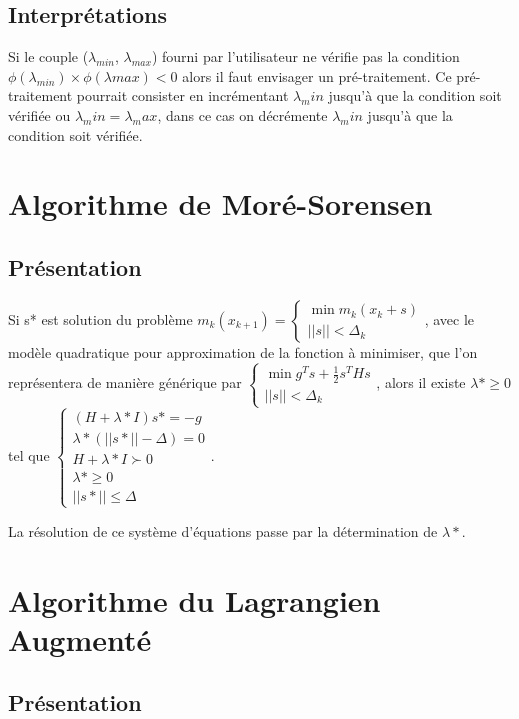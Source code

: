 \documentclass[a4paper,12pt]{article}
\theoremstyle{break}
\begin{document}
\subsection{Interprétations}
Si le couple ($\lambda_{min}$, $\lambda_{max}$) fourni par l'utilisateur ne vérifie pas la condition $\phi(\lambda_{min}) \times \phi(\lambda{max}) < 0$ alors il faut envisager un pré-traitement. Ce pré-traitement pourrait consister en incrémentant $\lambda_min$ jusqu'à que la condition soit vérifiée ou $\lambda_min = \lambda_max$, dans ce cas on décrémente $\lambda_min$ jusqu'à que la condition soit vérifiée.

\newpage

\section{Algorithme de Moré-Sorensen}
\subsection{Présentation}

Si s* est solution du problème 
$m_k(x_{k+1}) = \begin{cases}
			\min m_k(x_k+s) \\
			||s||< \Delta_k
		\end{cases}$, avec le modèle quadratique pour approximation de la fonction à minimiser, que l’on représentera de manière générique par $\begin{cases}
			\min g^T s + \frac{1}{2} s^T H s \\
			||s||< \Delta_k
		\end{cases}$, alors il existe $\lambda* \geq 0$ tel que $\begin{cases}
			(H + \lambda*I)s* = -g \\
			\lambda*(||s*|| - \Delta) = 0\\
			H + \lambda*I \succ 0\\
			\lambda* \geq 0\\
			||s*|| \leq \Delta
		\end{cases}$.

La résolution de ce système d’équations passe par la détermination de $\lambda*$.


\newpage

\section{Algorithme du Lagrangien Augmenté}
\subsection{Présentation}
\end{document}

